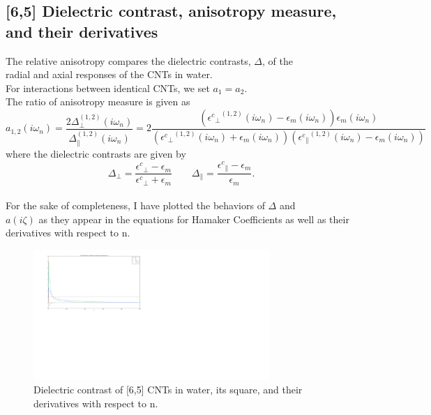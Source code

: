 \documentclass[a4paper]{article}
\begin{document}
\subsection{[6,5] Dielectric contrast, anisotropy measure, and their derivatives}
\begin{center}
The relative anisotropy compares the dielectric contrasts, $\Delta$, of the\\ 
radial and axial responses of the CNTs in water.\\
\smallskip{}
For interactions between identical CNTs, we set $a_{1}=a_{2}$.\\  

\smallskip{}
The ratio of anisotropy measure is given as
\begin{equation}
a_{1,2}(i \omega_n) = \frac{2 \Delta_{\perp}^{(1,2)}(i\omega_n)}{\Delta_{\parallel}^{(1,2)}(i \omega_n)} = 
2 \frac{({{\epsilon^{c}}_{\perp}}^{(1,2)}(i \omega_n) -\epsilon_{m}(i \omega_n)) \epsilon_{m}(i \omega_n)}{({{\epsilon^{c}}_{\perp}}^{(1,2)}(i \omega_n)+\epsilon_{m}(i \omega_n)) ({{\epsilon^{c}}_{\parallel}}^{(1,2)}(i \omega_n) -\epsilon_{m}(i \omega_n))}
\label{eq:adef}
\end{equation}
where the dielectric contrasts are given by
\begin{equation}
\Delta_{\perp}=\frac{{\epsilon^{c}}_{\perp}-\epsilon_{m}}{{\epsilon^{c}}_{\perp}+\epsilon_{m}}\qquad\Delta_{\parallel}=\frac{{\epsilon^{c}}_{\parallel}-\epsilon_{m}}{\epsilon_{m}}.
\label{anisoind}
\end{equation}
\\
For the sake of completeness, I have plotted the behaviors of $\Delta$ and\\
$a(i\zeta)$ as they appear in the equations for Hamaker Coefficients as well as
their derivatives with respect to n.
\begin{figure}[t!]
\begin{center}
    \includegraphics[width=0.8\textwidth,scale= 0.8]{plots/delta_derivs_65.png}
\hskip 43pt
\caption{Dielectric contrast of [6,5] CNTs in water, its square, and their
derivatives with respect to n.} 
\label{eiz65}
\end{center}
\end{figure} 


\end{center}
\end{document}
